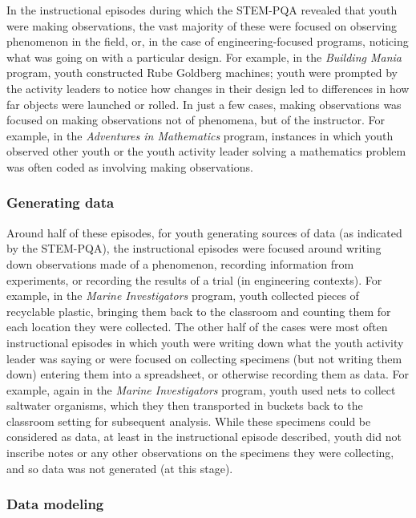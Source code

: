 \documentclass[]{msu-thesis}
\theoremstyle{definition}
\theoremstyle{definition}
\theoremstyle{definition}
\theoremstyle{remark}
\begin{document}
In the instructional episodes during which the STEM-PQA revealed that
youth were making observations, the vast majority of these were focused
on observing phenomenon in the field, or, in the case of
engineering-focused programs, noticing what was going on with a
particular design. For example, in the \emph{Building Mania} program,
youth constructed Rube Goldberg machines; youth were prompted by the
activity leaders to notice how changes in their design led to
differences in how far objects were launched or rolled. In just a few
cases, making observations was focused on making observations not of
phenomena, but of the instructor. For example, in the \emph{Adventures
in Mathematics} program, instances in which youth observed other youth
or the youth activity leader solving a mathematics problem was often
coded as involving making observations.

\subsubsection{Generating data}\label{generating-data}

Around half of these episodes, for youth generating sources of data (as
indicated by the STEM-PQA), the instructional episodes were focused
around writing down observations made of a phenomenon, recording
information from experiments, or recording the results of a trial (in
engineering contexts). For example, in the \emph{Marine Investigators}
program, youth collected pieces of recyclable plastic, bringing them
back to the classroom and counting them for each location they were
collected. The other half of the cases were most often instructional
episodes in which youth were writing down what the youth activity leader
was saying or were focused on collecting specimens (but not writing them
down) entering them into a spreadsheet, or otherwise recording them as
data. For example, again in the \emph{Marine Investigators} program,
youth used nets to collect saltwater organisms, which they then
transported in buckets back to the classroom setting for subsequent
analysis. While these specimens could be considered as data, at least in
the instructional episode described, youth did not inscribe notes or any
other observations on the specimens they were collecting, and so data
was not generated (at this stage).

\subsubsection{Data modeling}\label{data-modeling}
\end{document}
